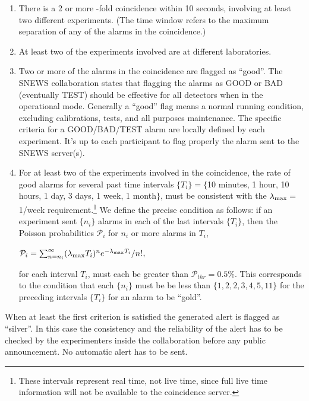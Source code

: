 \documentclass{article}
\begin{document}
\begin{enumerate}

\item There is a 2 or more -fold coincidence within 10 seconds,
involving at least two different experiments. 
(The time window refers to the maximum
separation of any of the alarms in the coincidence.)

\item At least two of the experiments involved
are at different laboratories.

\item Two or more of the alarms in the coincidence
are flagged as ``good''.  The SNEWS collaboration states
that flagging the alarms as GOOD or BAD (eventually TEST) should be effective 
for all detectors when in the operational  mode. 
Generally a ``good'' flag means a normal running condition, excluding 
calibrations, tests, and all purposes maintenance.  
The specific criteria for a GOOD/BAD/TEST alarm are locally defined by
each experiment. 
It's up to each participant to flag properly the alarm sent to the SNEWS 
server(s).  
 
\item For at least two of the experiments involved in the coincidence,
the rate of good alarms for several past time intervals $\{T_i\}=\{$10 minutes, 1
hour, 10 hours, 1 day, 3 days, 1 week, 1 month$\}$, must be consistent with
the $\lambda_{\rm{max}}=$1/week requirement.\footnote{These intervals
represent real time, not live time, since full live time information
will not be available to the coincidence server.}
We define the precise condition 
as follows:  
if an experiment sent $\{n_i\}$ alarms in 
each of the last intervals $\{T_i\}$,
then the Poisson probabilities $\mathcal{P}_i$ for $n_i$ or more
alarms in $T_i$,

$\mathcal{P}_i=\sum_{n=n_i}^{\infty}(\lambda_{\rm{max}} T_i)^{n}e^{-\lambda_{\rm{max}} T_i}/n!$,

for each interval $T_i$, must each be greater than $\mathcal{P}_{thr}=0.5$\%.
This corresponds to the condition that each $\{n_i\}$ must be be less
than $\{1,2,2,3,4,5,11\}$ for the preceding intervals $\{T_i\}$ for an
alarm to be ``gold''.

\end{enumerate}

When at least the first criterion is satisfied the generated alert is
flagged as ``silver''. In this case the consistency and the reliability 
of the alert has to be checked by the experimenters inside the collaboration before any public announcement. No automatic alert has to be sent.
\end{document}

